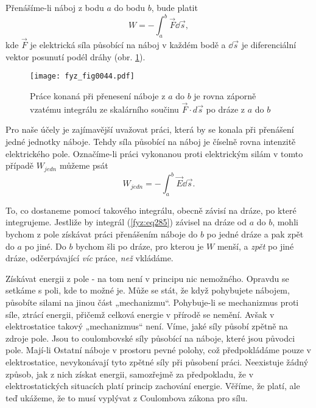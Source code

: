     Přenášíme-li náboj z bodu \(a\) do bodu \(b\), bude platit
    \begin{equation*}
      W = -\int_{a}^{b}\vec{F}\dd{\vec{s}},
    \end{equation*}
    kde \(\vec{F}\) je elektrická síla působící na náboj v každém bodě a \(\dd{\vec{s}}\) je 
    diferenciální vektor posunutí podél dráhy (obr. \ref{fyz:fig0044}).

    \begin{figure}[ht!]  %
      \centering
      \texttt{[image: fyz\_fig0044.pdf]}
      \caption{Práce konaná při přenesení náboje z \(a\) do \(b\) je rovna záporně vzatému 
        integrálu ze skalárního součinu \(\vec{F}\cdot d\vec{s}\) po dráze z \(a\) do \(b\)}
      \label{fyz:fig0044}
    \end{figure}    
    Pro naše účely je zajímavější uvažovat práci, která by se konala při přenášení jedné jednotky 
    náboje. Tehdy síla působící na náboj je číselně rovna intenzitě elektrického pole. Označíme-li 
    práci vykonanou proti elektrickým silám v tomto případě \(W_{jedn}\) můžeme psát
    \begin{equation}\label{fyz:eq285}
      W_{jedn} = -\int_{a}^{b}\vec{E}\dd{\vec{s}}.
    \end{equation}
    
    To, co dostaneme pomocí takového integrálu, obecně závisí na dráze, po které integrujeme. 
    Jestliže by integrál (\ref{fyz:eq285}) závisel na dráze od \(a\) do \(b\), mohli 
    bychom z pole získávat práci přenášením náboje do \(b\) po jedné dráze a pak zpět do \(a\) po 
    jiné. Do \(b\) bychom šli po dráze, pro kterou je \(W\) menší, a \emph{zpět} po jiné dráze, 
    odčerpávající \emph{víc} práce, \emph{než} vkládáme.
    
    Získávat energii z pole - na tom není v principu nic nemožného. Opravdu se setkáme s poli, kde 
    to možné je. Může se stát, že když pohybujete nábojem, působíte silami na jinou část 
    „mechanizmu“. Pohybuje-li se mechanizmus proti síle, ztrácí energii, přičemž celková energie v 
    přírodě se nemění. Avšak v elektrostatice takový „mechanizmus“ není. Víme, jaké síly působí 
    zpětně na zdroje pole. Jsou to coulombovské síly působící na náboje, které jsou původci pole. 
    Mají-li Ostatní náboje v prostoru pevné polohy, což předpokládáme pouze v elektrostatice, 
    nevykonávají tyto zpětné síly při působení práci. Neexistuje žádný způsob, jak z nich získat 
    energii, samozřejmě za předpokladu, že v elektrostatických situacích platí princip zachování 
    energie. Věříme, že platí, ale teď ukážeme, že to musí vyplývat z Coulombova zákona pro 
    sílu.         
    
